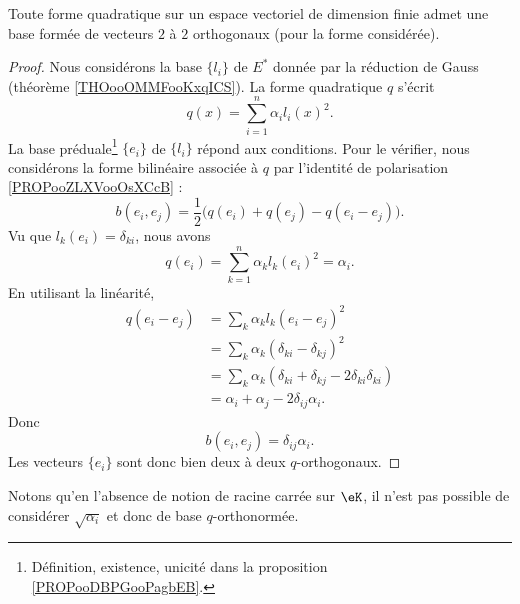 \begin{theorem}       \label{THOooIDMPooIMwkqB}
	Toute forme quadratique sur un espace vectoriel de dimension finie admet une base formée de vecteurs \( 2\) à \( 2\) orthogonaux (pour la forme considérée).
\end{theorem}

\begin{proof}
	Nous considérons la base \(  \{ l_i \}    \) de \( E^*\) donnée par la réduction de Gauss (théorème \ref{THOooOMMFooKxqICS}). La forme quadratique \( q\) s'écrit
	\begin{equation}
		q(x)=\sum_{i=1}^n\alpha_il_i(x)^2.
	\end{equation}
	La base préduale\footnote{Définition, existence, unicité dans la proposition \ref{PROPooDBPGooPagbEB}.} \( \{ e_i \}\) de \( \{ l_i \}\) répond aux conditions. Pour le vérifier, nous considérons la forme bilinéaire associée à \( q\) par l'identité de polarisation \ref{PROPooZLXVooOsXCcB} :
	\begin{equation}
		b(e_i,e_j)=\frac{ 1 }{2}\big( q(e_i)+q(e_j)-q(e_i-e_j) \big).
	\end{equation}
	Vu que \( l_k(e_i)=\delta_{ki}\), nous avons
	\begin{equation}
		q(e_i)=\sum_{k=1}^n\alpha_kl_k(e_i)^2=\alpha_i.
	\end{equation}
	En utilisant la linéarité,
	\begin{subequations}
		\begin{align}
			q(e_i-e_j) & =\sum_k\alpha_kl_k(e_i-e_j)^2                                    \\
			           & =\sum_k\alpha_k(\delta_{ki}-\delta_{kj})^2                       \\
			           & =\sum_k\alpha_k(\delta_{ki}+\delta_{kj}-2\delta_{ki}\delta_{ki}) \\
			           & =\alpha_i+\alpha_j-2\delta_{ij}\alpha_i.
		\end{align}
	\end{subequations}
	Donc
	\begin{equation}
		b(e_i,e_j)=\delta_{ij}\alpha_i.
	\end{equation}
	Les vecteurs \( \{ e_i \}\) sont donc bien deux à deux \( q\)-orthogonaux.
\end{proof}

Notons qu'en l'absence de notion de racine carrée sur \( \eK\), il n'est pas possible de considérer \( \sqrt{ \alpha_i }\) et donc de base \( q\)-orthonormée.


